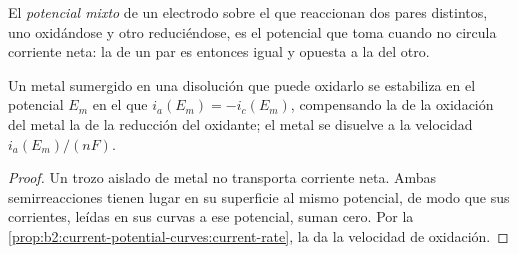 \begin{definition}\label{def:b2:batteries-electrolysis:mixed-potential}
El \emph{potencial mixto} de un electrodo sobre el que reaccionan dos
pares distintos, uno oxidándose y otro reduciéndose, es el potencial que
toma cuando no circula corriente neta: la  de un par es entonces
igual y opuesta a la  del otro.
\end{definition}

\begin{proposition}\label{prop:b2:batteries-electrolysis:mixed}
Un metal sumergido en una disolución que puede oxidarlo se estabiliza en el potencial
$E_m$ en el que $i_a(E_m) = -i_c(E_m)$, compensando la  de la oxidación del metal
la  de la reducción del oxidante; el
metal se disuelve a la velocidad $i_a(E_m)/(nF)$.
\end{proposition}

\begin{proof}
Un trozo aislado de metal no transporta corriente neta. Ambas semirreacciones tienen lugar
en su superficie al mismo potencial, de modo que sus corrientes, leídas en sus curvas
a ese potencial, suman cero. Por la \cref{prop:b2:current-potential-curves:current-rate},
la  da la velocidad de oxidación.
\end{proof}

